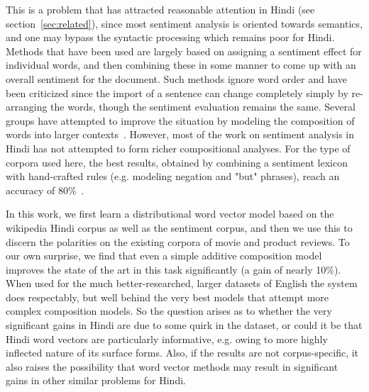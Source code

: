 \def\DevnagVersion{2.15}\documentclass[11pt]{article}
\begin{document}
This is a problem that has attracted reasonable attention in Hindi (see section~\ref{sec:related}), since most sentiment
analysis is oriented towards semantics, and one may bypass the syntactic
processing which remains poor for Hindi.   Methods that have been used
are largely based on assigning a sentiment effect for individual words, and
then combining these in some manner to come up with an overall sentiment for
the document.  Such methods ignore word order and have been
criticized since the import of a sentence can change completely simply by
re-arranging the words, though the sentiment evaluation remains the same.
Several groups have attempted to improve the situation by modeling
the composition of words into larger contexts~\cite{Mikolov:13c,Socher:13,Johnson:14,baroni-bernardi-14_frege-in-space-distributional-semantics}.
However, most of the work on sentiment analysis in Hindi has not attempted to
form richer compositional analyses.   For the type of corpora used here, the 
best results, obtained by combining a sentiment lexicon with hand-crafted rules (e.g. modeling negation and "but" phrases), reach an accuracy of 80\%~\cite{Mittal:13}.  

In this work, we first learn a distributional word vector model
based on the wikipedia Hindi corpus as well as the sentiment corpus, and then
we use this to discern 
the polarities on the existing corpora of movie and product reviews.
To our own surprise, we find that even a simple additive composition model
improves the state of the art in this task significantly (a gain of nearly
10\%). 
When used for the much better-researched, larger datasets of English
the system does respectably, but well behind the very best
models that attempt more complex composition models. 
So the question arises as to whether the very significant gains in
Hindi are due to some quirk in the 
dataset, or could it be that Hindi word vectors are particularly informative,
e.g. owing to more highly inflected nature of its
surface forms.  Also, if the results are not corpus-specific, it also raises
the possibility that word vector methods may result in significant gains in
other similar problems for Hindi. 
 
\end{document}
